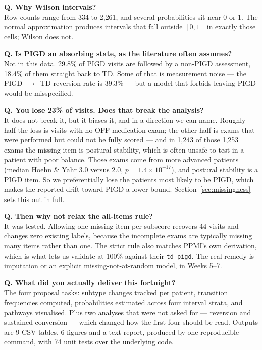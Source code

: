 \documentclass[11pt,a4paper]{article}
\newcommand{\code}[1]{\texttt{\small #1}}
\newcommand{\arr}{$\rightarrow$}
\begin{document}
\medskip
\noindent\textbf{Q. Why Wilson intervals?}\\
Row counts range from 334 to 2{,}261, and several probabilities sit near 0 or
1. The normal approximation produces intervals that fall outside $[0,1]$ in
exactly those cells; Wilson does not.

\medskip
\noindent\textbf{Q. Is PIGD an absorbing state, as the literature often assumes?}\\
Not in this data. 29.8\% of PIGD visits are followed by a non-PIGD assessment,
18.4\% of them straight back to TD. Some of that is measurement noise --- the
PIGD~\arr~TD reversion rate is 39.3\% --- but a model that forbids leaving PIGD
would be misspecified.

\medskip
\noindent\textbf{Q. You lose 23\% of visits. Does that break the analysis?}\\
It does not break it, but it biases it, and in a direction we can name. Roughly
half the loss is visits with no OFF-medication exam; the other half is exams
that were performed but could not be fully scored --- and in 1{,}243 of those
1{,}253 exams the missing item is postural stability, which is often unsafe to
test in a patient with poor balance. Those exams come from more advanced
patients (median Hoehn \& Yahr 3.0 versus 2.0, $p = 1.4\times10^{-17}$), and
postural stability is a PIGD item. So we preferentially lose the patients most
likely to be PIGD, which makes the reported drift toward PIGD a lower bound.
Section~\ref{sec:missingness} sets this out in full.

\medskip
\noindent\textbf{Q. Then why not relax the all-items rule?}\\
It was tested. Allowing one missing item per subscore recovers 44 visits and
changes zero existing labels, because the incomplete exams are typically
missing many items rather than one. The strict rule also matches PPMI's own
derivation, which is what lets us validate at 100\% against their
\code{td\_pigd}. The real remedy is imputation or an explicit
missing-not-at-random model, in Weeks 5--7.

\medskip
\noindent\textbf{Q. What did you actually deliver this fortnight?}\\
The four proposal tasks: subtype changes tracked per patient, transition
frequencies computed, probabilities estimated across four interval strata, and
pathways visualised. Plus two analyses that were not asked for --- reversion and
sustained conversion --- which changed how the first four should be read.
Outputs are 9 CSV tables, 6 figures and a text report, produced by one
reproducible command, with 74 unit tests over the underlying code.
\end{document}
